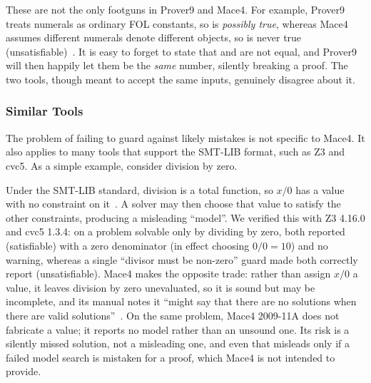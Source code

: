 These are not the only footguns in Prover9 and Mace4. For example, Prover9 treats numerals as ordinary FOL constants, so  is \emph{possibly true}, whereas Mace4 assumes different numerals denote different objects, so  is never true (unsatisfiable)~\cite{mccune2009mace4input}. It is easy to forget to state that  and  are not equal, and Prover9 will then happily let them be the \emph{same} number, silently breaking a proof. The two tools, though meant to accept the same inputs, genuinely disagree about it.

\subsubsection{Similar Tools}

The problem of failing to guard against likely mistakes is not specific to Mace4. It also applies to many tools that support the SMT-LIB format, such as Z3 and cvc5. As a simple example, consider division by zero.

Under the SMT-LIB standard, division is a total function, so $x / 0$ has a value with no constraint on it~\cite{BarFT-RR-25}. A solver may then choose that value to satisfy the other constraints, producing a misleading ``model''. We verified this with Z3 4.16.0 and cvc5 1.3.4: on a problem solvable only by dividing by zero, both reported  (satisfiable) with a zero denominator (in effect choosing $0 / 0 = 10$) and no warning, whereas a single ``divisor must be non-zero'' guard made both correctly report  (unsatisfiable). Mace4 makes the opposite trade: rather than assign $x / 0$ a value, it leaves division by zero unevaluated, so it is sound but may be incomplete, and its manual notes it ``might say that there are no solutions when there are valid solutions''~\cite{mccune2009mace4arithmetic}. On the same problem, Mace4 2009-11A does not fabricate a value; it reports no model rather than an unsound one. Its risk is a silently missed solution, not a misleading one, and even that misleads only if a failed model search is mistaken for a proof, which Mace4 is not intended to provide.


